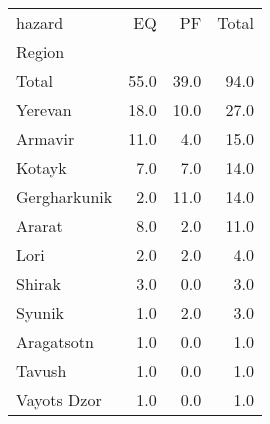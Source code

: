 \begin{tabular}{lrrr}
\toprule
hazard &    EQ &    PF &  Total \\
Region       &       &       &        \\
\midrule
Total        &  55.0 &  39.0 &   94.0 \\
Yerevan      &  18.0 &  10.0 &   27.0 \\
Armavir      &  11.0 &   4.0 &   15.0 \\
Kotayk       &   7.0 &   7.0 &   14.0 \\
Gergharkunik &   2.0 &  11.0 &   14.0 \\
Ararat       &   8.0 &   2.0 &   11.0 \\
Lori         &   2.0 &   2.0 &    4.0 \\
Shirak       &   3.0 &   0.0 &    3.0 \\
Syunik       &   1.0 &   2.0 &    3.0 \\
Aragatsotn   &   1.0 &   0.0 &    1.0 \\
Tavush       &   1.0 &   0.0 &    1.0 \\
Vayots Dzor  &   1.0 &   0.0 &    1.0 \\
\bottomrule
\end{tabular}
